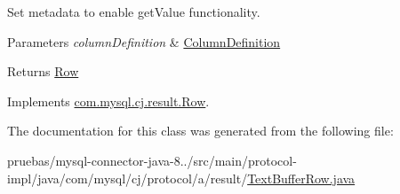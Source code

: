Set metadata to enable get\+Value functionality.


\begin{DoxyParams}{Parameters}
{\em column\+Definition} & \mbox{\hyperlink{interfacecom_1_1mysql_1_1cj_1_1protocol_1_1_column_definition}{Column\+Definition}} \\
\hline
\end{DoxyParams}
\begin{DoxyReturn}{Returns}
\mbox{\hyperlink{}{Row}} 
\end{DoxyReturn}


Implements \mbox{\hyperlink{interfacecom_1_1mysql_1_1cj_1_1result_1_1_row_ab80b0f47123d2771840acead9bc094d0}{com.\+mysql.\+cj.\+result.\+Row}}.



The documentation for this class was generated from the following file\+:\begin{DoxyCompactItemize}
\item 
pruebas/mysql-\/connector-\/java-\/8../src/main/protocol-\/impl/java/com/mysql/cj/protocol/a/result/\mbox{\hyperlink{_text_buffer_row_8java}{Text\+Buffer\+Row.\+java}}\end{DoxyCompactItemize}

